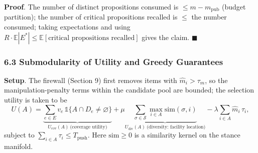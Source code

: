 \documentclass[
  11pt]{article}
\begin{document}
\textbf{Proof}. The number of distinct propositions consumed is
\(\le m - m_{\mathrm{pub}}\) (budget partition); the number of critical
propositions recalled is \(\le\) the number consumed; taking
expectations and using
\(R \cdot \mathbb{E}|E^*| \le \mathbb{E}[\text{critical propositions recalled}]\)
gives the claim. \(\blacksquare\)

\subsubsection{6.3 Submodularity of Utility and Greedy
Guarantees}\label{submodularity-of-utility-and-greedy-guarantees}

\textbf{Setup}. The firewall (Section 9) first removes items with
\(\hat m_i > \tau_m\), so the manipulation-penalty terms within the
candidate pool are bounded; the selection utility is taken to be
\[U(A) = \underbrace{\sum_{e \in E} v_e\, \mathbb{1}\{A \cap D_e \ne \varnothing\}}_{U_{\mathrm{cov}}(A)\ \text{(coverage utility)}} + \mu \underbrace{\sum_{\sigma \in \mathcal{S}} \max_{i \in A} \mathrm{sim}(\sigma, i)}_{U_{\mathrm{div}}(A)\ \text{(diversity: facility location)}} - \lambda \sum_{i \in A} \hat m_i\, \tau_i,\]
subject to \(\sum_{i \in A} \tau_i \le T_{\mathrm{push}}\). Here
\(\mathrm{sim} \ge 0\) is a similarity kernel on the stance manifold.
\end{document}
